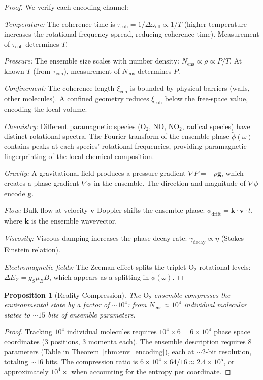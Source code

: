 \documentclass[12pt]{article}
\newtheorem{proposition}[theorem]{Proposition}
\theoremstyle{definition}
\theoremstyle{remark}
\newcommand{\xicoh}{\xi_{\mathrm{coh}}}
\newcommand{\Nens}{N_{\mathrm{ens}}}
\begin{document}
\begin{proof}
We verify each encoding channel:

\emph{Temperature:} The coherence time is $\tau_{\mathrm{coh}} = 1/\Delta\omega_{\mathrm{eff}} \propto 1/T$ (higher temperature increases the rotational frequency spread, reducing coherence time). Measurement of $\tau_{\mathrm{coh}}$ determines $T$.

\emph{Pressure:} The ensemble size scales with number density: $\Nens \propto \rho \propto P/T$. At known $T$ (from $\tau_{\mathrm{coh}}$), measurement of $\Nens$ determines $P$.

\emph{Confinement:} The coherence length $\xicoh$ is bounded by physical barriers (walls, other molecules). A confined geometry reduces $\xicoh$ below the free-space value, encoding the local volume.

\emph{Chemistry:} Different paramagnetic species ($\mathrm{O}_2$, NO, $\mathrm{NO}_2$, radical species) have distinct rotational spectra. The Fourier transform of the ensemble phase $\tilde{\phi}(\omega)$ contains peaks at each species' rotational frequencies, providing paramagnetic fingerprinting of the local chemical composition.

\emph{Gravity:} A gravitational field produces a pressure gradient $\nabla P = -\rho \mathbf{g}$, which creates a phase gradient $\nabla\phi$ in the ensemble. The direction and magnitude of $\nabla\phi$ encode $\mathbf{g}$.

\emph{Flow:} Bulk flow at velocity $\mathbf{v}$ Doppler-shifts the ensemble phase: $\phi_{\mathrm{drift}} = \mathbf{k} \cdot \mathbf{v} \cdot t$, where $\mathbf{k}$ is the ensemble wavevector.

\emph{Viscosity:} Viscous damping increases the phase decay rate: $\gamma_{\mathrm{decay}} \propto \eta$ (Stokes-Einstein relation).

\emph{Electromagnetic fields:} The Zeeman effect splits the triplet $\mathrm{O}_2$ rotational levels: $\Delta E_Z = g_S \mu_B B$, which appears as a splitting in $\tilde{\phi}(\omega)$.
\end{proof}

\begin{proposition}[Reality Compression]
\label{prop:compression}
The $\mathrm{O}_2$ ensemble compresses the environmental state by a factor of $\sim 10^4$: from $\Nens \approx 10^4$ individual molecular states to $\sim 15$ bits of ensemble parameters.
\end{proposition}

\begin{proof}
Tracking $10^4$ individual molecules requires $10^4 \times 6 = 6 \times 10^4$ phase space coordinates (3 positions, 3 momenta each). The ensemble description requires 8 parameters (Table in Theorem~\ref{thm:env_encoding}), each at $\sim 2$-bit resolution, totaling $\sim 16$ bits. The compression ratio is $6 \times 10^4 \times 64 / 16 \approx 2.4 \times 10^5$, or approximately $10^4 \times$ when accounting for the entropy per coordinate.
\end{proof}
\end{document}
